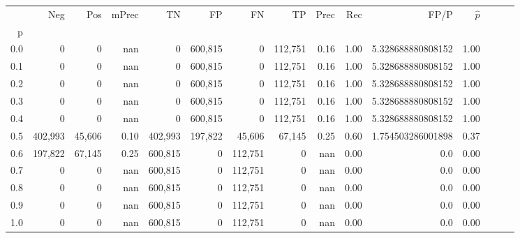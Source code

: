 \begin{tabular}{rrrrrrrrrrrrrrr}
\toprule
{} &      Neg &     Pos & mPrec &       TN &       FP &       FN &       TP &  Prec &   Rec &               FP/P & $\hat{p}$ \\
p   &          &         &       &          &          &          &          &       &       &                    &           \\
\midrule
0.0 &        0 &       0 &   nan &        0 &  600,815 &        0 &  112,751 &  0.16 &  1.00 &  5.328688880808152 &      1.00 \\
0.1 &        0 &       0 &   nan &        0 &  600,815 &        0 &  112,751 &  0.16 &  1.00 &  5.328688880808152 &      1.00 \\
0.2 &        0 &       0 &   nan &        0 &  600,815 &        0 &  112,751 &  0.16 &  1.00 &  5.328688880808152 &      1.00 \\
0.3 &        0 &       0 &   nan &        0 &  600,815 &        0 &  112,751 &  0.16 &  1.00 &  5.328688880808152 &      1.00 \\
0.4 &        0 &       0 &   nan &        0 &  600,815 &        0 &  112,751 &  0.16 &  1.00 &  5.328688880808152 &      1.00 \\
0.5 &  402,993 &  45,606 &  0.10 &  402,993 &  197,822 &   45,606 &   67,145 &  0.25 &  0.60 &  1.754503286001898 &      0.37 \\
0.6 &  197,822 &  67,145 &  0.25 &  600,815 &        0 &  112,751 &        0 &   nan &  0.00 &                0.0 &      0.00 \\
0.7 &        0 &       0 &   nan &  600,815 &        0 &  112,751 &        0 &   nan &  0.00 &                0.0 &      0.00 \\
0.8 &        0 &       0 &   nan &  600,815 &        0 &  112,751 &        0 &   nan &  0.00 &                0.0 &      0.00 \\
0.9 &        0 &       0 &   nan &  600,815 &        0 &  112,751 &        0 &   nan &  0.00 &                0.0 &      0.00 \\
1.0 &        0 &       0 &   nan &  600,815 &        0 &  112,751 &        0 &   nan &  0.00 &                0.0 &      0.00 \\
\bottomrule
\end{tabular}
